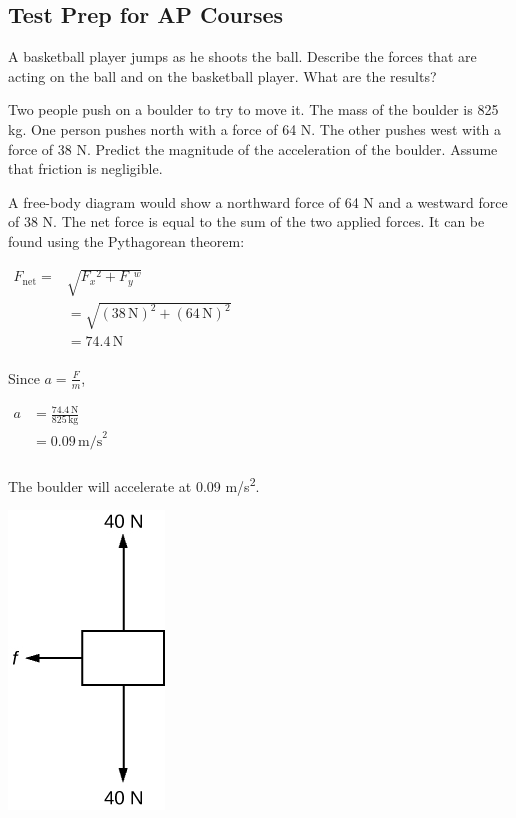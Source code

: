 \documentclass[
]{book}
\begin{document}
\hypertarget{fs-id1925843}{}
\hypertarget{test-prep-for-ap-courses-13}{%
\subsection{Test Prep for AP Courses}\label{test-prep-for-ap-courses-13}}

\hypertarget{fs-id1471760}{}
\leavevmode{}%
A basketball player jumps as he shoots the ball. Describe the forces
that are acting on the ball and on the basketball player. What are the
results?

\hypertarget{fs-id1669265}{}
\leavevmode{}%
Two people push on a boulder to try to move it. The mass of the boulder
is 825 kg. One person pushes north with a force of 64 N. The other
pushes west with a force of 38 N. Predict the magnitude of the
acceleration of the boulder. Assume that friction is negligible.

\leavevmode{}%
A free-body diagram would show a northward force of 64 N and a westward
force of 38 N. The net force is equal to the sum of the two applied
forces. It can be found using the Pythagorean theorem:

\(\begin{matrix} {F_{\text{net}} =} & \sqrt{F_{x}{}^{2} + F_{y}{}^{w}} \\  & {= \sqrt{{(38\,\text{N})}^{2} + {(64\,\text{N})}^{2}}} \\  & {= 74.4\,\text{N}} \\ \end{matrix}\)

Since \(a = \frac{F}{m}\),

\(\begin{matrix} a & {= \frac{74.4\,\text{N}}{825\,\text{kg}}} \\  & {= 0.09\,\text{m/s}^{\text{2}}} \\ \end{matrix}\)

The boulder will accelerate at 0.09 m/s\textsuperscript{2}.

\hypertarget{fs-id1046422}{}
\leavevmode{}%
\includegraphics{images/Figure_04_07_09.jpg}
\end{document}
